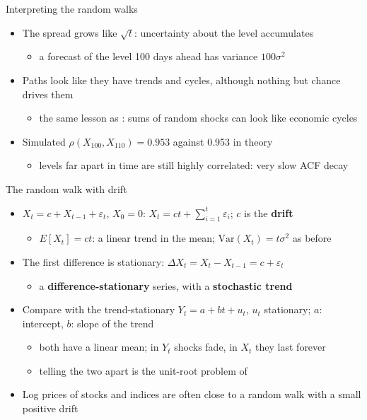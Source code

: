 \begin{frame}{Interpreting the random walks}
\itemsize{\small}
\begin{itemize}
    \item The spread grows like $\sqrt{t}$: uncertainty about the level accumulates
    \begin{itemize}
        \item a forecast of the level 100 days ahead has variance $100\sigma^2$
    \end{itemize}
    \item Paths look like they have trends and cycles, although nothing but chance drives them
    \begin{itemize}
        \item the same lesson as : sums of random shocks can look like economic cycles
    \end{itemize}
    \item Simulated $\rho(X_{100}, X_{110}) = 0.953$ against 0.953 in theory
    \begin{itemize}
        \item levels far apart in time are still highly correlated: very slow ACF decay
    \end{itemize}
\end{itemize}
\end{frame}

\begin{frame}{The random walk with drift}
\itemsize{\small}
\begin{itemize}
    \item $X_t = c + X_{t-1} + \varepsilon_t$, $X_0 = 0$: $X_t = ct + \sum_{i=1}^{t}\varepsilon_i$; $c$ is the \textbf{drift}
    \begin{itemize}
        \item $E[X_t] = ct$: a linear trend in the mean; $\mathrm{Var}(X_t) = t\sigma^2$ as before
    \end{itemize}
    \item The first difference is stationary: $\Delta X_t = X_t - X_{t-1} = c + \varepsilon_t$
    \begin{itemize}
        \item a \textbf{difference-stationary} series, with a \textbf{stochastic trend}
    \end{itemize}
    \item Compare with the trend-stationary $Y_t = a + bt + u_t$, $u_t$ stationary; $a$: intercept, $b$: slope of the trend
    \begin{itemize}
        \item both have a linear mean; in $Y_t$ shocks fade, in $X_t$ they last forever
        \item telling the two apart is the unit-root problem of 
    \end{itemize}
    \item Log prices of stocks and indices are often close to a random walk with a small positive drift
\end{itemize}
\end{frame}

